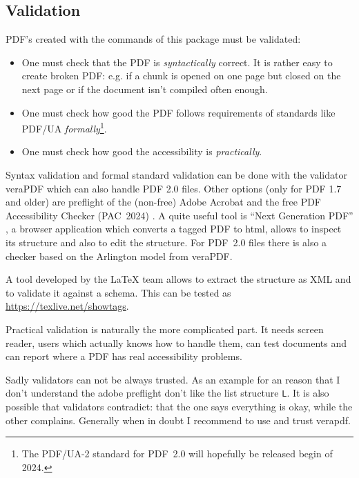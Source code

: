\documentclass[bibliography=totoc,a4paper]{article}
\newcommand\PDF{PDF}
\begin{document}
\subsection{Validation}

\PDF{}'s created with the commands of this package must be validated:

\begin{itemize}
\item
 One must check that the \PDF{} is \emph{syntactically} correct. 
 It is rather easy to create broken \PDF{}:
 e.g. if a chunk is opened on one page but closed 
 on the next page or if the document isn't compiled often enough.

\item One must check how good the PDF follows requirements of standards 
    like PDF/UA \emph{formally}\footnote{The PDF/UA-2 standard for \PDF~2.0 
    will hopefully be released begin of 2024.}. 

\item
One must check how good the accessibility is \emph{practically}.
\end{itemize}


Syntax validation and formal standard validation can be done with the
validator veraPDF \parencite{verapdf} which can also handle PDF 2.0 files. 
Other options (only for PDF 1.7 and older) are preflight of the (non-free) Adobe Acrobat and the free \PDF{} Accessibility Checker (PAC~2024) \parencite{pac2024}. 
A quite useful tool 
is \enquote{Next Generation PDF} \parencite{ngpdf}, a browser application 
which converts a tagged PDF to html, allows to inspect its structure and also 
to edit the structure. For PDF~2.0 files there is also a checker based on the 
Arlington model from veraPDF. 

A tool developed by the \LaTeX{} team allows to extract the structure as XML and to validate it against a schema. This can be tested as \url{https://texlive.net/showtags}.

Practical validation is naturally the more complicated part. 
It needs screen reader, users which actually knows how to handle them, 
can test documents and can report where a \PDF{} has real accessibility problems.



Sadly validators can not be always trusted. 
As an example for an reason that I don't understand the adobe preflight 
don't like the list structure \texttt{L}.
It is also possible that validators contradict: that the one says everything is okay, 
while the other complains. Generally when in doubt I recommend to use and trust verapdf. 
\end{document}
